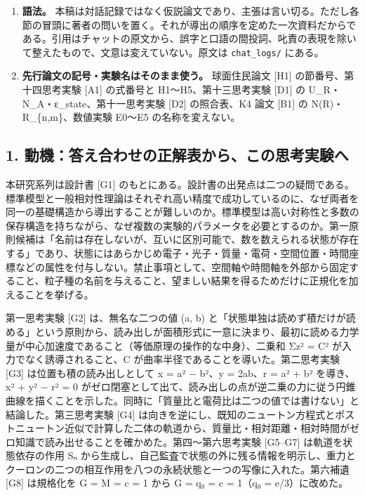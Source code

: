 \documentclass[
  a4paper,
]{ltjsarticle}
\begin{document}
\begin{enumerate}
  {[}A1
  §7.6{]}。「近いが一致しない」ことは埋めるべき穴ではなく、仮説の中身である。
\item
  \textbf{語法。}
  本稿は対話記録ではなく仮説論文であり、主張は言い切る。ただし各節の冒頭に著者の問いを置く。それが導出の順序を定めた一次資料だからである。引用はチャットの原文から、誤字と口語の間投詞、叱責の表現を除いて整えたもので、文意は変えていない。原文は
  \texttt{chat\_\allowbreak{}logs/\allowbreak{}} にある。
\item
  \textbf{先行論文の記号・実験名はそのまま使う。} 球面住民論文 {[}H1{]}
  の節番号、第十四思考実験 {[}A1{]} の式番号と H1〜H5、第十三思考実験
  {[}D1{]} の U\_R・N\_A・ε\_state、第十一思考実験 {[}D2{]} の照合表、K4
  論文 {[}B1{]} の N(R)・R\_\{n,m\}、数値実験 E0〜E5 の名称を変えない。
\end{enumerate}

\subsection{1.
動機：答え合わせの正解表から、この思考実験へ}\label{ux52d5ux6a5fux7b54ux3048ux5408ux308fux305bux306eux6b63ux89e3ux8868ux304bux3089ux3053ux306eux601dux8003ux5b9fux9a13ux3078}

本研究系列は設計書 {[}G1{]}
のもとにある。設計書の出発点は二つの疑問である。標準模型と一般相対性理論はそれぞれ高い精度で成功しているのに、なぜ両者を同一の基礎構造から導出することが難しいのか。標準模型は高い対称性と多数の保存構造を持ちながら、なぜ複数の実験的パラメータを必要とするのか。第一原則候補は「名前は存在しないが、互いに区別可能で、数を数えられる状態が存在する」であり、状態にはあらかじめ電子・光子・質量・電荷・空間位置・時間座標などの属性を付与しない。禁止事項として、空間軸や時間軸を外部から固定すること、粒子種の名前を与えること、望ましい結果を得るためだけに正規化を加えることを挙げる。

第一思考実験 {[}G2{]} は、無名な二つの値 (a, b)
と「状態単独は読めず積だけが読める」という原則から、読み出しが面積形式に一意に決まり、最初に読める力学量が中心加速度であること（等価原理の操作的な中身）、二乗和
Σz² = C² が入力でなく誘導されること、C
が曲率半径であることを導いた。第二思考実験 {[}G3{]}
は位置も積の読み出しとして x = a² − b²、y = 2ab、r = a² + b² を導き、x²
+ y² − r² = 0
がゼロ閉塞として出て、読み出しの点が逆二乗の力に従う円錐曲線を描くことを示した。同時に「質量比と電荷比は二つの値では書けない」と結論した。第三思考実験
{[}G4{]}
は向きを逆にし、既知のニュートン方程式とポストニュートン近似で計算した二体の軌道から、質量比・相対距離・相対時間がゼロ知識で読み出せることを確かめた。第四〜第六思考実験
{[}G5--G7{]} は軌道を状態依存の作用 Sₙ
から生成し、自己監査で状態の外に残る情報を明示し、重力とクーロンの二つの相互作用を八つの永続状態と一つの写像に入れた。第六補遺
{[}G8{]} は規格化を G = M = c = 1 から G = q₀ = c = 1（q₀ =
e/3）に改めた。
\end{document}
